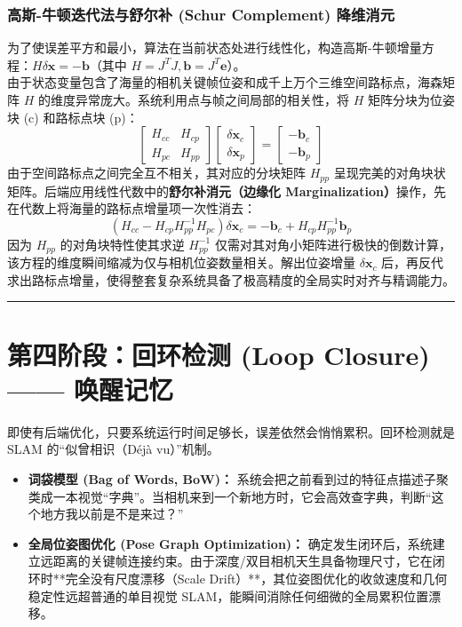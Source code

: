 \documentclass[12pt,a4paper]{article}
\begin{document}
\subsubsection{高斯-牛顿迭代法与舒尔补 (Schur Complement) 降维消元}
为了使误差平方和最小，算法在当前状态处进行线性化，构造高斯-牛顿增量方程：$H \delta \mathbf{x} = - \mathbf{b}$（其中 $H = J^T J, \mathbf{b} = J^T \mathbf{e}$）。\\
由于状态变量包含了海量的相机关键帧位姿和成千上万个三维空间路标点，海森矩阵 $H$ 的维度异常庞大。系统利用点与帧之间局部的相关性，将 $H$ 矩阵分块为位姿块 (c) 和路标点块 (p)：
\begin{equation}
    \begin{bmatrix} 
        H_{cc} & H_{cp} \\ 
        H_{pc} & H_{pp} 
    \end{bmatrix} 
    \begin{bmatrix} 
        \delta \mathbf{x}_c \\ 
        \delta \mathbf{x}_p 
    \end{bmatrix} = 
    \begin{bmatrix} 
        -\mathbf{b}_c \\ 
        -\mathbf{b}_p 
    \end{bmatrix}
\end{equation}
由于空间路标点之间完全互不相关，其对应的分块矩阵 $H_{pp}$ 呈现完美的对角块状矩阵。后端应用线性代数中的\textbf{舒尔补消元（边缘化 Marginalization）}操作，先在代数上将海量的路标点增量项一次性消去：
\begin{equation}
    (H_{cc} - H_{cp} H_{pp}^{-1} H_{pc}) \delta \mathbf{x}_c = -\mathbf{b}_c + H_{cp} H_{pp}^{-1} \mathbf{b}_p
\end{equation}
因为 $H_{pp}$ 的对角块特性使其求逆 $H_{pp}^{-1}$ 仅需对其对角小矩阵进行极快的倒数计算，该方程的维度瞬间缩减为仅与相机位姿数量相关。解出位姿增量 $\delta \mathbf{x}_c$ 后，再反代求出路标点增量，使得整套复杂系统具备了极高精度的全局实时对齐与精调能力。

\vspace{0.5cm}
\hrule
\vspace{0.5cm}

\section{第四阶段：回环检测 (Loop Closure) —— 唤醒记忆}
即使有后端优化，只要系统运行时间足够长，误差依然会悄悄累积。回环检测就是 SLAM 的“似曾相识（Déjà vu）”机制。
\begin{itemize}
    \item \textbf{词袋模型 (Bag of Words, BoW)：} 系统会把之前看到过的特征点描述子聚类成一本视觉“字典”。当相机来到一个新地方时，它会高效查字典，判断“这个地方我以前是不是来过？”
    \item \textbf{全局位姿图优化 (Pose Graph Optimization)：} 确定发生闭环后，系统建立远距离的关键帧连接约束。由于深度/双目相机天生具备物理尺寸，它在闭环时**完全没有尺度漂移（Scale Drift）**，其位姿图优化的收敛速度和几何稳定性远超普通的单目视觉 SLAM，能瞬间消除任何细微的全局累积位置漂移。
\end{itemize}
\end{document}
